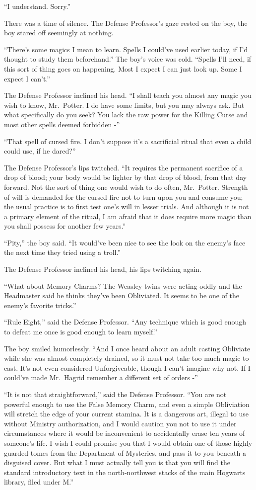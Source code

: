 ``I understand. Sorry.''

There was a time of silence. The Defense Professor's gaze rested on the
boy, the boy stared off seemingly at nothing.

``There's some magics I mean to learn. Spells I could've used earlier
today, if I'd thought to study them beforehand.'' The boy's voice was
cold. ``Spells I'll need, if this sort of thing goes on happening. Most
I expect I can just look up. Some I expect I can't.''

The Defense Professor inclined his head. ``I shall teach you almost any
magic you wish to know, Mr.~Potter. I do have some limits, but you may
always ask. But what specifically do you seek? You lack the raw power
for the Killing Curse and most other spells deemed forbidden -''

``That spell of cursed fire. I don't suppose it's a sacrificial ritual
that even a child could use, if he dared?''

The Defense Professor's lips twitched. ``It requires the permanent
sacrifice of a drop of blood; your body would be lighter by that drop of
blood, from that day forward. Not the sort of thing one would wish to do
often, Mr.~Potter. Strength of will is demanded for the cursed fire not
to turn upon you and consume you; the usual practice is to first test
one's will in lesser trials. And although it is not a primary element of
the ritual, I am afraid that it does require more magic than you shall
possess for another few years.''

``Pity,'' the boy said. ``It would've been nice to see the look on the
enemy's face the next time they tried using a troll.''

The Defense Professor inclined his head, his lips twitching again.

``What about Memory Charms? The Weasley twins were acting oddly and the
Headmaster said he thinks they've been Obliviated. It seems to be one of
the enemy's favorite tricks.''

``Rule Eight,'' said the Defense Professor. ``Any technique which is
good enough to defeat me once is good enough to learn myself.''

The boy smiled humorlessly. ``And I once heard about an adult casting
Obliviate while she was almost completely drained, so it must not take
too much magic to cast. It's not even considered Unforgiveable, though I
can't imagine why not. If I could've made Mr.~Hagrid remember a
different set of orders -''

``It is not that straightforward,'' said the Defense Professor. ``You
are not powerful enough to use the False Memory Charm, and even a simple
Obliviation will stretch the edge of your current stamina. It is a
dangerous art, illegal to use without Ministry authorization, and I
would caution you not to use it under circumstances where it would be
inconvenient to accidentally erase ten years of someone's life. I wish I
could promise you that I would obtain one of those highly guarded tomes
from the Department of Mysteries, and pass it to you beneath a disguised
cover. But what I must actually tell you is that you will find the
standard introductory text in the north-northwest stacks of the main
Hogwarts library, filed under M.''

